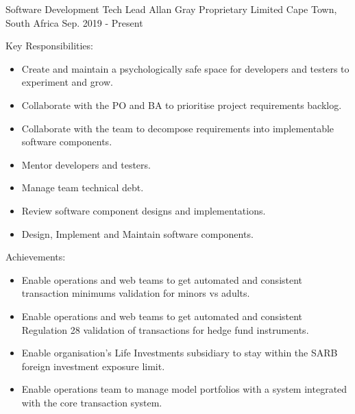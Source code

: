 

\begin{cventries}
  \cventry
    {Software Development Tech Lead} %
    {Allan Gray Proprietary Limited} %
    {Cape Town, South Africa} %
    {Sep. 2019 - Present} %
    {
      \begin{cvitems} %
        \item {Key Responsibilities:}
        \begin{itemize}
          \item {Create and maintain a psychologically safe space for developers and testers to experiment and grow.}
          \item {Collaborate with the PO and BA to prioritise project requirements backlog.}
          \item {Collaborate with the team to decompose requirements into implementable software components.}
          \item {Mentor developers and testers.}
          \item {Manage team technical debt.}
          \item {Review software component designs and implementations.}
          \item {Design, Implement and Maintain software components.}
        \end{itemize}
        \item {Achievements:}
        \begin{itemize}
          \item {Enable operations and web teams to get automated and consistent transaction minimums validation for minors vs adults.}
          \item {Enable operations and web teams to get automated and consistent Regulation 28 validation of transactions for hedge fund instruments.}
          \item {Enable organisation's Life Investments subsidiary to stay within the SARB foreign investment exposure limit.}
          \item {Enable operations team to manage model portfolios with a system integrated with the core transaction system.}
        \end{itemize}
      \end{cvitems}
    }


\end{cventries}
